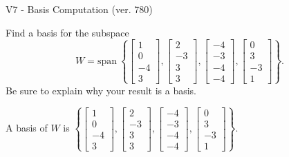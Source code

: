 \begin{exercise}
  \begin{exerciseTitle}V7 - Basis Computation (ver. 780)\end{exerciseTitle}
  \begin{exerciseStatement}
    Find a basis for the subspace 
\[W=\mathrm{span}\ \left\{\left[\begin{array}{r}
1 \\
0 \\
-4 \\
3
\end{array}\right] , \left[\begin{array}{r}
2 \\
-3 \\
3 \\
3
\end{array}\right] , \left[\begin{array}{r}
-4 \\
-3 \\
-4 \\
-4
\end{array}\right] , \left[\begin{array}{r}
0 \\
3 \\
-3 \\
1
\end{array}\right]\right\}.\]
 Be sure to explain why your result is a basis.


  \end{exerciseStatement}
  \begin{exerciseAnswer}
   A basis of \(W\) is  \(\left\{\left[\begin{array}{r}
1 \\
0 \\
-4 \\
3
\end{array}\right] , \left[\begin{array}{r}
2 \\
-3 \\
3 \\
3
\end{array}\right] , \left[\begin{array}{r}
-4 \\
-3 \\
-4 \\
-4
\end{array}\right] , \left[\begin{array}{r}
0 \\
3 \\
-3 \\
1
\end{array}\right]\right\}\).
  


  \end{exerciseAnswer}
\end{exercise}